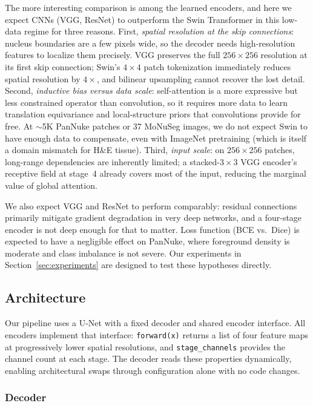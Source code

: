 \documentclass{article}
\begin{document}
The more interesting comparison is among the learned encoders, and here we expect CNNs (VGG, ResNet) to outperform the Swin Transformer in this low-data regime for three reasons. First, \emph{spatial resolution at the skip connections}: nucleus boundaries are a few pixels wide, so the decoder needs high-resolution features to localize them precisely. VGG preserves the full $256\times256$ resolution at its first skip connection; Swin's $4\times4$ patch tokenization immediately reduces spatial resolution by $4\times$, and bilinear upsampling cannot recover the lost detail. Second, \emph{inductive bias versus data scale}: self-attention is a more expressive but less constrained operator than convolution, so it requires more data to learn translation equivariance and local-structure priors that convolutions provide for free. At ${\sim}$5K PanNuke patches or 37 MoNuSeg images, we do not expect Swin to have enough data to compensate, even with ImageNet pretraining (which is itself a domain mismatch for H\&E tissue). Third, \emph{input scale}: on $256\times256$ patches, long-range dependencies are inherently limited; a stacked-$3\times3$ VGG encoder's receptive field at stage~4 already covers most of the input, reducing the marginal value of global attention.

We also expect VGG and ResNet to perform comparably: residual connections primarily mitigate gradient degradation in very deep networks, and a four-stage encoder is not deep enough for that to matter. Loss function (BCE vs.\ Dice) is expected to have a negligible effect on PanNuke, where foreground density is moderate and class imbalance is not severe. Our experiments in Section~\ref{sec:experiments} are designed to test these hypotheses directly.

\subsection{Architecture}
\label{sec:architecture}

Our pipeline uses a U-Net with a fixed decoder and shared encoder interface. All encoders implement that interface: \texttt{forward(x)} returns a list of four feature maps at progressively lower spatial resolutions, and \texttt{stage\_channels} provides the channel count at each stage. The decoder reads these properties dynamically, enabling architectural swaps through configuration alone with no code changes.

\subsubsection{Decoder}
\end{document}
